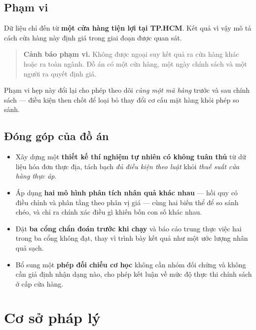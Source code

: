\documentclass[11pt]{article}
\begin{document}
\subsection{Phạm vi}

Dữ liệu chỉ đến từ \textbf{một cửa hàng tiện lợi tại TP.HCM}. Kết quả vì vậy mô tả cách cửa hàng
này định giá trong giai đoạn được quan sát.

\begin{quote}
\textbf{Cảnh báo phạm vi.} Không được ngoại suy kết quả ra cửa hàng khác hoặc ra toàn ngành. Đồ án
có một cửa hàng, một ngày chính sách và một người ra quyết định giá.
\end{quote}

Phạm vi hẹp này đổi lại cho phép theo dõi \emph{cùng một mã hàng} trước và sau chính sách --- điều
kiện then chốt để loại bỏ thay đổi cơ cấu mặt hàng khỏi phép so sánh.

\subsection{Đóng góp của đồ án}

\begin{itemize}
  \item Xây dựng một \textbf{thiết kế thí nghiệm tự nhiên có không tuân thủ} từ dữ liệu hóa đơn
  thực địa, tách bạch \emph{đủ điều kiện theo luật} khỏi \emph{thuế suất cửa hàng thực áp}.
  \item Áp dụng \textbf{hai mô hình phân tích nhân quả khác nhau} --- hồi quy có điều chỉnh và
  phân tầng theo phân vị giá --- cùng hai biến thể để so sánh chéo, và chỉ ra chính xác điều gì
  khiến bốn con số khác nhau.
  \item Đặt \textbf{ba cổng chẩn đoán trước khi chạy} và báo cáo trung thực việc hai trong ba cổng
  không đạt, thay vì trình bày kết quả như một ước lượng nhân quả sạch.
  \item Bổ sung một \textbf{phép đối chiếu cơ học} không cần nhóm đối chứng và không cần giả định
  nhận dạng nào, cho phép kết luận về mức độ thực thi chính sách ở cấp cửa hàng.
\end{itemize}

\section{Cơ sở pháp lý}
\end{document}

